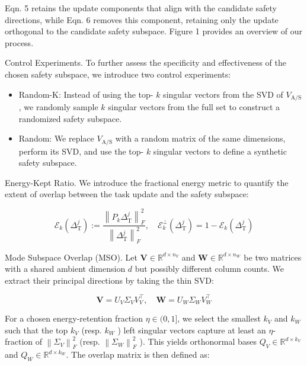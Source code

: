 \documentclass[10pt]{article}
\begin{document}
Eqn. 5 retains the update components that align with the candidate safety directions, while Eqn. 6 removes this component, retaining only the update orthogonal to the candidate safety subspace. Figure 1 provides an overview of our process.

Control Experiments. To further assess the specificity and effectiveness of the chosen safety subspace, we introduce two control experiments:

\begin{itemize}
  \item Random-K: Instead of using the top- $k$ singular vectors from the SVD of $V_{\mathrm{A} / \mathrm{S}}$, we randomly sample $k$ singular vectors from the full set to construct a randomized safety subspace.
  \item Random: We replace $V_{\mathrm{A} / \mathrm{S}}$ with a random matrix of the same dimensions, perform its SVD, and use the top- $k$ singular vectors to define a synthetic safety subspace.
\end{itemize}

Energy-Kept Ratio. We introduce the fractional energy metric to quantify the extent of overlap between the task update and the safety subspace:


\begin{equation*}
\mathcal{E}_{k}\left(\Delta_{\mathrm{T}}^{j}\right):=\frac{\left\|P_{k} \Delta_{\mathrm{T}}^{j}\right\|_{F}^{2}}{\left\|\Delta_{\mathrm{T}}^{j}\right\|_{F}^{2}}, \quad \mathcal{E}_{k}^{\perp}\left(\Delta_{\mathrm{T}}^{j}\right)=1-\mathcal{E}_{k}\left(\Delta_{\mathrm{T}}^{j}\right) \tag{7}
\end{equation*}


Mode Subspace Overlap (MSO). Let $\mathbf{V} \in \mathbb{R}^{d \times n_{V}}$ and $\mathbf{W} \in \mathbb{R}^{d \times n_{W}}$ be two matrices with a shared ambient dimension $d$ but possibly different column counts. We extract their principal directions by taking the thin SVD:


\begin{equation*}
\mathbf{V}=U_{V} \Sigma_{V} V_{V}^{\top}, \quad \mathbf{W}=U_{W} \Sigma_{W} V_{W}^{\top} \tag{8}
\end{equation*}


For a chosen energy-retention fraction $\eta \in(0,1]$, we select the smallest $k_{V}$ and $k_{W}$ such that the top $k_{V}$ (resp. $k_{W}$ ) left singular vectors capture at least an $\eta$-fraction of $\left\|\Sigma_{V}\right\|_{F}^{2}$ (resp. $\left\|\Sigma_{W}\right\|_{F}^{2}$ ). This yields orthonormal bases $Q_{V} \in \mathbb{R}^{d \times k_{V}}$ and $Q_{W} \in \mathbb{R}^{d \times k_{W}}$. The overlap matrix is then defined as:
\end{document}
